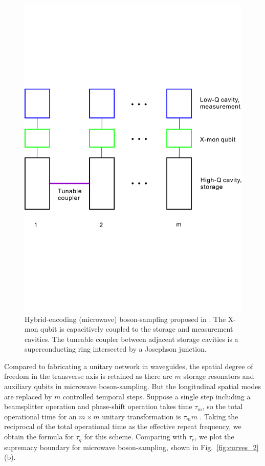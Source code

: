 \documentclass[aps,rmp,twocolumn,amsmath,amssymb,nofootinbib,superscriptaddress]{revtex4}
\newcommand{\comment}[1]{{\color{blue}{#1}}}
\begin{document}
\begin{figure}[!htb]
\includegraphics[width=\columnwidth]{microwave}
\caption{Hybrid-encoding (microwave) boson-sampling proposed in \cite{bib:20}. The X-mon qubit is capacitively coupled to the storage and measurement cavities. The tuneable coupler between adjacent storage cavities is a superconducting ring intersected by a Josephson junction.} \label{fig:microwave}
\end{figure}

Compared to fabricating a unitary network in waveguides, the spatial degree of freedom in the transverse axis is retained as there are $m$ storage resonators and auxiliary qubits in microwave boson-sampling. But the longitudinal spatial modes are replaced by $m$ controlled temporal steps. Suppose a single step including a beamsplitter operation and phase-shift operation takes time $\tau_m$, so the total operational time for an \mbox{$m\times m$} unitary transformation is $\tau_m m$ \comment{Shouldn't this be $m^2$?}. Taking the reciprocal of the total operational time as the effective repeat frequency, we obtain the formula for $\tau_q$ for this scheme. Comparing with $\tau_c$, we plot the supremacy boundary for microwave boson-sampling, shown in Fig.~\ref{fig:curves_2}(b).
\end{document}
